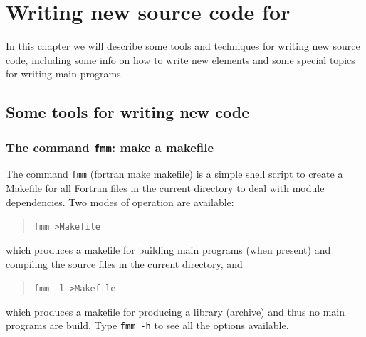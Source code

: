 
\chapter{Writing new source code for \tfem}

\def\chaptertitle{Writing new source code for \tfem}
\def\headdate{14th December 2025}

In this chapter we will describe some tools and techniques for writing new
source code, including some info on how to write new elements and some special topics for writing main programs.

\section{Some tools for writing new code}
\subsection{The command \texttt{fmm}: make a makefile}
\label{sec:fmm}

The command \texttt{fmm} (fortran make makefile) is a simple shell script
to create a Makefile 
for all Fortran files
in the current directory to deal with module dependencies. Two modes of
operation are available:
\begin{quote}
       \texttt{fmm >Makefile}
\end{quote}
which produces a makefile for building main programs (when present) and
compiling the source files in the current directory, and
\begin{quote}
       \texttt{fmm -l >Makefile}
\end{quote}
which produces a makefile for producing a library (archive)
and thus no main programs are build.
Type \texttt{fmm -h} to see all the options available.

